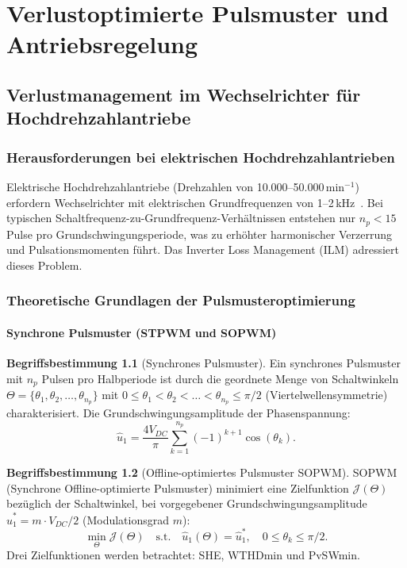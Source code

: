 ﻿\documentclass[a4paper,12pt,openany,oneside]{book}
\newcommand{\abschnitt}[1]{\section{#1}}
\newcommand{\unterabschnitt}[1]{\subsection{#1}}
\theoremstyle{definition}
\newtheorem{definition}{Begriffsbestimmung}[chapter]
\begin{document}
\part{Verlustoptimierte Pulsmuster und Antriebsregelung}

\chapter{Verlustmanagement im Wechselrichter f\"ur Hochdrehzahlantriebe}
\label{kap:sopwm}

\abschnitt{Herausforderungen bei elektrischen Hochdrehzahlantrieben}

Elektrische Hochdrehzahlantriebe (Drehzahlen von 10.000--50.000\,min$^{-1}$) erfordern
Wechselrichter mit elektrischen Grundfrequenzen von 1--2\,kHz~\cite{Peter2022}. Bei
typischen Schaltfrequenz-zu-Grundfrequenz-Verh\"altnissen entstehen nur $n_p < 15$ Pulse
pro Grundschwingungsperiode, was zu erh\"ohter harmonischer Verzerrung und Pulsations\-momenten
f\"uhrt. Das Inverter Loss Management (ILM) adressiert dieses Problem.

\abschnitt{Theoretische Grundlagen der Pulsmusteroptimierung}

\unterabschnitt{Synchrone Pulsmuster (STPWM und SOPWM)}

\begin{definition}[Synchrones Pulsmuster]
  Ein synchrones Pulsmuster mit $n_p$ Pulsen pro Halbperiode ist durch die geordnete
  Menge von Schaltwinkeln $\Theta = \{\theta_1, \theta_2, \ldots, \theta_{n_p}\}$ mit
  $0 \leq \theta_1 < \theta_2 < \ldots < \theta_{n_p} \leq \pi/2$ (Viertelwellensymmetrie)
  charakterisiert. Die Grundschwingungsamplitude der Phasenspannung:
  \[
    \hat{u}_1 = \frac{4 V_{DC}}{\pi}\sum_{k=1}^{n_p}(-1)^{k+1}\cos(\theta_k).
  \]
\end{definition}

\begin{definition}[Offline-optimiertes Pulsmuster SOPWM]
  SOPWM (Synchrone Offline-optimierte Pulsmuster) minimiert eine Zielfunktion
  $\mathcal{J}(\Theta)$ bez\"uglich der Schaltwinkel, bei vorgegebener
  Grundschwingungsamplitude $\hat{u}_1^* = m \cdot V_{DC}/2$ (Modulationsgrad $m$):
  \[
    \min_\Theta \mathcal{J}(\Theta) \quad\text{s.t.}\quad
    \hat{u}_1(\Theta) = \hat{u}_1^*, \quad 0 \leq \theta_k \leq \pi/2.
  \]
  Drei Zielfunktionen werden betrachtet: SHE, WTHDmin und PvSWmin.
\end{definition}
\end{document}
